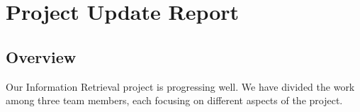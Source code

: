 \documentclass[unicode,9pt,a4paper,oneside,numbers=endperiod,openany]{scrartcl}
\begin{document}
\setassignment
{}

\newline

\section{Project Update Report}

\subsection{Overview}
Our Information Retrieval project is progressing well. We have divided the work among three team members, each focusing on different aspects of the project.
\end{document}
